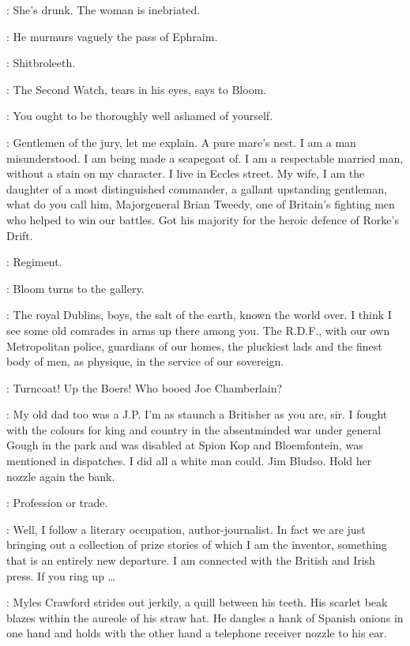 \Bloom:
She's drunk.
The woman is inebriated.

:
He murmurs vaguely the pass of Ephraim.

\Bloom:
Shitbroleeth.

:
The Second Watch, tears in his eyes, says to Bloom.

\SecondWatch:
You ought to be thoroughly well ashamed of yourself.

\Bloom:
Gentlemen of the jury, let me explain.
A pure mare's nest.
I am a man misunderstood.
I am being made a scapegoat of.
I am a respectable married man, without a stain on my character.
I live in Eccles street.
My wife, I am the daughter of a most distinguished commander,
a gallant upstanding gentleman,
what do you call him, Majorgeneral Brian Tweedy,
one of Britain's fighting men who helped to win our battles.
Got his majority for the heroic defence of Rorke's Drift.

\FirstWatch:
Regiment.

:
Bloom turns to the gallery.

\Bloom:
The royal Dublins, boys, the salt of the earth, known the world over.
I think I see some old comrades in arms up there among you.
The R.D.F., with our own Metropolitan police,
guardians of our homes, the pluckiest lads and the finest body of men,
as physique, in the service of our sovereign.

\Voice:
Turncoat! Up the Boers! Who booed Joe Chamberlain?

\Bloom:
My old dad too was a J.P.
I'm as staunch a Britisher as you are, sir.
I fought with the colours for king and country
in the absentminded war under general Gough in the park
and was disabled at Spion Kop and Bloemfontein,
was mentioned in dispatches.
I did all a white man could.
Jim Bludso.
Hold her nozzle again the bank.

\FirstWatch:
Profession or trade.

\Bloom:
Well, I follow a literary occupation, author-journalist.
In fact we are just bringing out a collection of prize stories
of which I am the inventor, something that is an entirely new departure.
I am connected with the British and Irish press.
If you ring up \ldots

:
Myles Crawford strides out jerkily, a quill between his teeth.
His scarlet beak blazes within the aureole of his straw hat.
He dangles a hank of Spanish onions in one hand and holds with the other hand
a telephone receiver nozzle to his ear.

